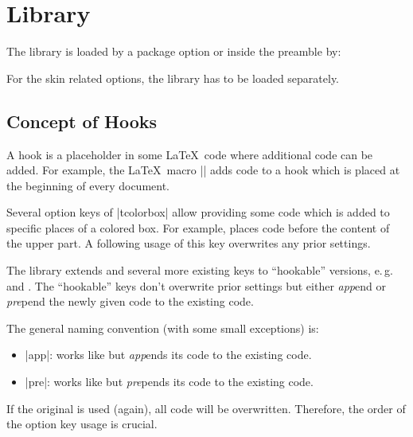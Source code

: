 \clearpage
\section{Library }\label{sec:hooks}%
%
The library is loaded by a package option or inside the preamble by:
\begin{dispListing}
\end{dispListing}

For the skin related options, the library  has to be loaded
separately.


\subsection{Concept of Hooks}
A hook is a placeholder in some \LaTeX\ code where additional code
can be added. For example, the \LaTeX\ macro |\AtBeginDocument| adds code to a
hook which is placed at the beginning of every document.

Several option keys of |tcolorbox| allow providing some code which is
added to specific places of a colored box. For example, 
places code before the content of the upper part. A following usage of this
key overwrites any prior settings.

The library  extends  and several more
existing keys to \enquote{hookable} versions, e.\,g.\ 
 and .
The \enquote{hookable} keys don't overwrite prior settings but either \emph{app}end
or \emph{pre}pend the newly given code to the existing code.

The general naming convention (with some small exceptions) is:
\begin{itemize}
\item {} |app|: works like  but
  \emph{app}ends its code to the existing code.
\item {} |pre|: works like \meta{option key} but
  \emph{pre}pends its code to the existing code.
\end{itemize}
If the original  is used (again), all code will be overwritten.
Therefore, the order of the option key usage is crucial.



